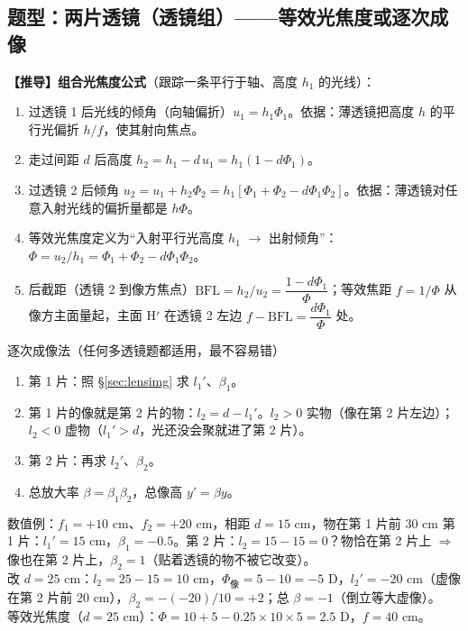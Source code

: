 \subsection{题型：两片透镜（透镜组）——等效光焦度或逐次成像}\label{sec:lenscombo}
\textbf{【推导】组合光焦度公式}（跟踪一条平行于轴、高度 $h_1$ 的光线）：
\begin{enumerate}
\item 过透镜 1 后光线的倾角（向轴偏折）$u_1=h_1\Phi_1$。依据：薄透镜把高度 $h$ 的平行光偏折 $h/f$，使其射向焦点。
\item 走过间距 $d$ 后高度 $h_2=h_1-d\,u_1=h_1(1-d\Phi_1)$。
\item 过透镜 2 后倾角 $u_2=u_1+h_2\Phi_2=h_1[\Phi_1+\Phi_2-d\Phi_1\Phi_2]$。依据：薄透镜对任意入射光线的偏折量都是 $h\Phi$。
\item 等效光焦度定义为“入射平行光高度 $h_1$ $\to$ 出射倾角”：$\Phi=u_2/h_1=\Phi_1+\Phi_2-d\Phi_1\Phi_2$。
\item 后截距（透镜 2 到像方焦点）$\mathrm{BFL}=h_2/u_2=\dfrac{1-d\Phi_1}{\Phi}$；等效焦距 $f=1/\Phi$ 从像方主面量起，主面 H$'$ 在透镜 2 左边 $f-\mathrm{BFL}=\dfrac{d\Phi_1}{\Phi}$ 处。
\end{enumerate}

\begin{recipe}{逐次成像法（任何多透镜题都适用，最不容易错）}
\begin{enumerate}
\item 第 1 片：照 §\ref{sec:lensimg} 求 $l_1'$、$\beta_1$。
\item 第 1 片的像就是第 2 片的物：$l_2=d-l_1'$。$l_2>0$ 实物（像在第 2 片左边）；$l_2<0$ 虚物（$l_1'>d$，光还没会聚就进了第 2 片）。
\item 第 2 片：再求 $l_2'$、$\beta_2$。
\item 总放大率 $\beta=\beta_1\beta_2$，总像高 $y'=\beta y$。
\end{enumerate}
\end{recipe}

\begin{exam}{数值例：$f_1=+10$ cm、$f_2=+20$ cm，相距 $d=15$ cm，物在第 1 片前 30 cm}
第 1 片：$l_1'=15$ cm，$\beta_1=-0.5$。第 2 片：$l_2=15-15=0$？物恰在第 2 片上 $\Rightarrow$ 像也在第 2 片上，$\beta_2=1$（贴着透镜的物不被它改变）。\\
改 $d=25$ cm：$l_2=25-15=10$ cm，$\Phi_{\text{像}}=5-10=-5$ D，$l_2'=-20$ cm（虚像在第 2 片前 20 cm），$\beta_2=-(-20)/10=+2$；总 $\beta=-1$（倒立等大虚像）。\\
等效光焦度（$d=25$ cm）：$\Phi=10+5-0.25\times10\times5=2.5$ D，$f=40$ cm。
\end{exam}


